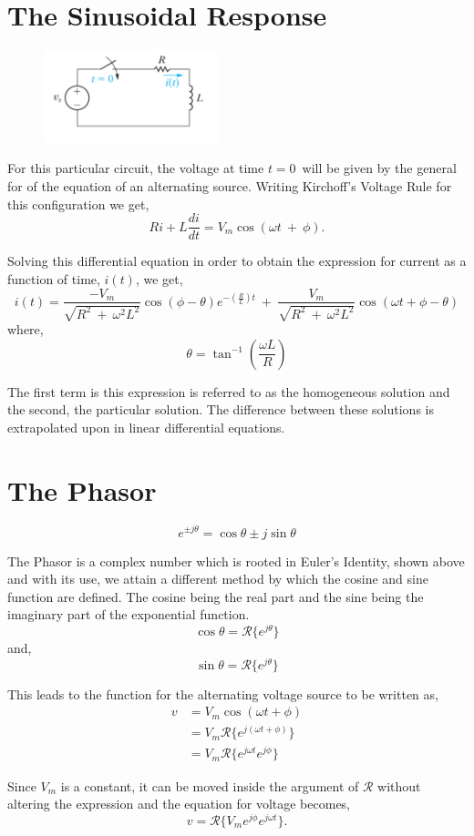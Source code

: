 \documentclass[12pt]{article}
\begin{document}
    \section*{The Sinusoidal Response}
    \begin{figure}[h]
        \centering
        \includegraphics[width=0.45\textwidth]{Resistor-Inductor Circuit.png}
    \end{figure}
    \par For this particular circuit, the voltage at time $t=0$ will be given by
    the general for of the equation of an alternating source. Writing Kirchoff's
    Voltage Rule for this configuration we get,
    \[
        Ri + L \frac{di}{dt} = V_m \cos (\omega t\ +\ \phi)
    .\]
    \par Solving this differential equation in order to obtain the expression
    for current as a function of time, $i(t)$, we get,
    \[
        i(t) =
        \frac{-V_m}{\sqrt{R^2\ +\ \omega^2 L^2}} \cos (\phi - \theta)
        e^{-\left( \frac{R}{L} \right) t}\ +\
        \frac{V_m}{\sqrt{R^2\ +\ \omega^2 L^2}} \cos (\omega t + \phi - \theta)
    \]
    where,
    \[
        \theta = \tan^{-1} \left( \frac{\omega L}{R} \right)
    \]
    \par The first term is this expression is referred to as the homogeneous
    solution and the second, the particular solution. The difference between
    these solutions is extrapolated upon in linear differential equations.
    \section*{The Phasor}
    \[
        e^{\pm j \theta} = \cos \theta \pm j \sin \theta
    \]
    \par The Phasor is a complex number which is rooted in Euler's Identity,
    shown above and with its use, we attain a different method by which the
    cosine and sine function are defined. The cosine being the real part and the
    sine being the imaginary part of the exponential function.
    \[
        \cos \theta = \mathscr{R} \{e^{j \theta}\}
    \]
    and,
    \[
        \sin \theta = \mathscr{R} \{e^{j \theta}\}
    \]
    \par This leads to the function for the alternating voltage source to be
    written as,
    \begin{align*}
        v &= V_m \cos (\omega t + \phi) \\
          &= V_m \mathscr{R} \{e^{j (\omega t + \phi)}\} \\
          &= V_m \mathscr{R} \{e^{j \omega t} e^{j \phi}\}
    \end{align*}
    \par Since $V_m$ is a constant, it can be moved inside the argument of
    $\mathscr{R}$ without altering the expression and the equation for voltage
    becomes,
    \[
        v = \mathscr{R} \{V_m e^{j \phi} e^{j \omega t}\}
    .\]
\end{document}
